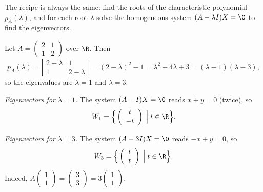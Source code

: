 The recipe is always the same: find the roots of the characteristic polynomial $p_A(\lambda)$, and for each
root $\lambda$ solve the homogeneous system $(A-\lambda I)X = \0$ to find the eigenvectors.

\begin{example}
Let $A = \left( \begin{smallmatrix} 2 & 1\\ 1 & 2 \end{smallmatrix} \right)$ over $\R$. Then
\[
p_A(\lambda) = \left| \begin{array}{cc} 2-\lambda & 1\\ 1 & 2-\lambda \end{array} \right|
= (2-\lambda)^2 - 1 = \lambda^2-4\lambda+3 = (\lambda-1)(\lambda-3),
\]
so the eigenvalues are $\lambda = 1$ and $\lambda = 3$.

\medskip
\noindent\emph{Eigenvectors for $\lambda = 1$.} The system $(A-I)X = \0$ reads $x+y = 0$ (twice), so
\[
W_1 = \Big\{ \left( \begin{array}{c} t \\ -t \end{array} \right) \;\Big|\; t\in \R \Big\}.
\]

\noindent\emph{Eigenvectors for $\lambda = 3$.} The system $(A-3I)X = \0$ reads $-x+y = 0$, so
\[
W_3 = \Big\{ \left( \begin{array}{c} t \\ t \end{array} \right) \;\Big|\; t\in \R \Big\}.
\]
Indeed, $A\left( \begin{smallmatrix} 1\\ 1 \end{smallmatrix} \right)
= \left( \begin{smallmatrix} 3\\ 3 \end{smallmatrix} \right)
= 3 \left( \begin{smallmatrix} 1\\ 1 \end{smallmatrix} \right)$.
\end{example}

